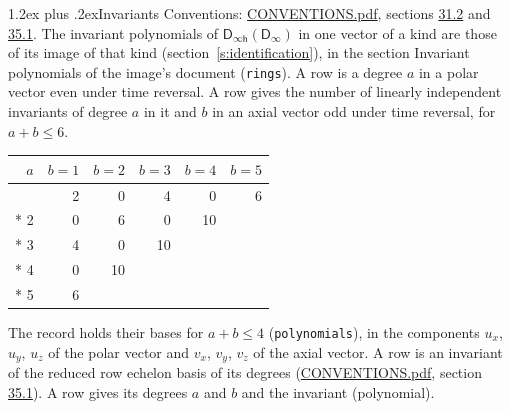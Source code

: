 \documentclass[10pt,a4paper]{article}
\makeatletter
\renewcommand\section{\@startsection{section}{1}{\z@}{-3ex plus -1ex minus -.2ex}%
  {1.2ex plus .2ex}{\normalfont\large\sffamily\bfseries\color{parttitle}}}
\numberwithin{equation}{section}
\newcommand{\grp}[1]{\mathsf{#1}}
\makeatother
\begin{document}
\section{Invariants}\label{s:invariants}
Conventions: \href{../../CONVENTIONS.pdf}{CONVENTIONS.pdf}, sections \href{../../CONVENTIONS.pdf\#conv.31.2}{31.2} and \href{../../CONVENTIONS.pdf\#conv.35.1}{35.1}.
The invariant polynomials of $\grp{D_{\infty h}}(\grp{D_{\infty}})$ in one vector of a kind are those of its image of that kind (section~\ref{s:identification}), in the section Invariant polynomials of the image's document (\texttt{rings}).
\leavevmode\label{n:index.degree.polar}\label{n:index.degree.axial}A row is a degree $a$ in a polar vector even under time reversal. A row gives the number of linearly independent invariants of degree $a$ in it and $b$ in an axial vector odd under time reversal, for $a + b \le 6$.
{\small\begin{longtable}{@{}rrrrrr@{}}\toprule
$a$ & $b = 1$ & $b = 2$ & $b = 3$ & $b = 4$ & $b = 5$\\\midrule\endhead
\bottomrule\endfoot\endlastfoot
1 & 2 & 0 & 4 & 0 & 6\\*
2 & 0 & 6 & 0 & 10 & \\*
3 & 4 & 0 & 10 &  & \\*
4 & 0 & 10 &  &  & \\*
5 & 6 &  &  &  & \\
\bottomrule\end{longtable}}
\leavevmode\label{n:local.component.polar}\label{n:local.component.axial}The record holds their bases for $a + b \le 4$ (\texttt{polynomials}), in the components $u_{x}$, $u_{y}$, $u_{z}$ of the polar vector and $v_{x}$, $v_{y}$, $v_{z}$ of the axial vector. \label{n:head.polynomial}A row is an invariant of the reduced row echelon basis of its degrees (\href{../../CONVENTIONS.pdf}{CONVENTIONS.pdf}, section \href{../../CONVENTIONS.pdf\#conv.35.1}{35.1}). A row gives its degrees $a$ and $b$ and the invariant (polynomial).
\end{document}

